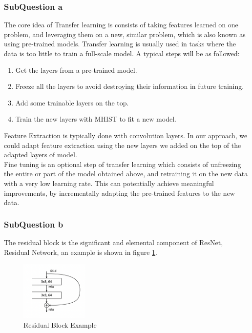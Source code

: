 \documentclass[conference]{IEEEtran}
\begin{document}
\subsubsection{SubQuestion a} %
The core idea of Transfer learning is consists of taking features learned on one problem, and leveraging them on a new, similar problem, which is also known as using pre-trained models. Transfer learning is usually used in tasks where the data is too little to train a full-scale model.\cite{keras} A typical steps will be as followed:
\begin{enumerate}
  \item Get the layers from a pre-trained model.
  \item Freeze all the layers to avoid destroying their information in future training.
  \item Add some trainable layers on the top.
  \item Train the new layers with MHIST to fit a new model.
\end{enumerate}
Feature Extraction is typically done with convolution layers. In our approach, we could adapt feature extraction using the new layers we added on the top of the adapted layers of model.
\\Fine tuning is an optional step of transfer learning which consists of unfreezing the entire or part of the model obtained above, and retraining it on the new data with a very low learning rate. This can potentially achieve meaningful improvements, by incrementally adapting the pre-trained features to the new data.\cite{keras}\cite{blog}
\subsubsection{SubQuestion b} %
The residual block is the significant and elemental component of ResNet, Residual Network, an example is shown in figure \ref{res}.

\begin{figure}[h] 
    \centering
    \includegraphics[width=0.3\textwidth]{./graphs/Task2/res-block.png}
    \caption{Residual Block Example}
    \label{res}
\end{figure}
\end{document}
